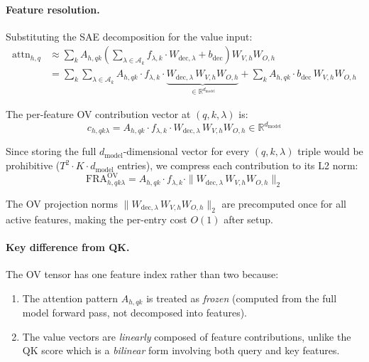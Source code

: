 \documentclass{article}
\theoremstyle{plain}
\theoremstyle{definition}
\theoremstyle{remark}
\newcommand{\dmodel}{d_{\mathrm{model}}}
\newcommand{\RR}{\mathbb{R}}
\begin{document}
\paragraph{Feature resolution.} Substituting the SAE decomposition for the value input:
\begin{align}
    \mathrm{attn}_{h,q} &\approx \sum_k A_{h,qk} \left( \sum_{\lambda \in \mathcal{A}_k} f_{\lambda,k} \cdot W_{\mathrm{dec},\lambda} + b_{\mathrm{dec}} \right) W_{V,h} W_{O,h} \\
    &= \sum_k \sum_{\lambda \in \mathcal{A}_k} A_{h,qk} \cdot f_{\lambda,k} \cdot \underbrace{W_{\mathrm{dec},\lambda}\, W_{V,h} W_{O,h}}_{\in \RR^{\dmodel}} + \sum_k A_{h,qk} \cdot b_{\mathrm{dec}}\, W_{V,h} W_{O,h}
\end{align}

The per-feature OV contribution vector at $(q, k, \lambda)$ is:
\begin{equation}
    c_{h,qk\lambda} = A_{h,qk} \cdot f_{\lambda,k} \cdot W_{\mathrm{dec},\lambda}\, W_{V,h} W_{O,h} \in \RR^{\dmodel}
\end{equation}

Since storing the full $\dmodel$-dimensional vector for every $(q,k,\lambda)$ triple would be prohibitive ($T^2 \cdot K \cdot \dmodel$ entries), we compress each contribution to its L2 norm:
\begin{equation}
    \mathrm{FRA}^{\mathrm{OV}}_{h,qk\lambda} = A_{h,qk} \cdot f_{\lambda,k} \cdot \|W_{\mathrm{dec},\lambda}\, W_{V,h} W_{O,h}\|_2
\end{equation}

The OV projection norms $\|W_{\mathrm{dec},\lambda}\, W_{V,h} W_{O,h}\|_2$ are precomputed once for all active features, making the per-entry cost $O(1)$ after setup.

\paragraph{Key difference from QK.} The OV tensor has one feature index rather than two because:
\begin{enumerate}
    \item The attention pattern $A_{h,qk}$ is treated as \emph{frozen} (computed from the full model forward pass, not decomposed into features).
    \item The value vectors are \emph{linearly} composed of feature contributions, unlike the QK score which is a \emph{bilinear} form involving both query and key features.
\end{enumerate}
\end{document}
